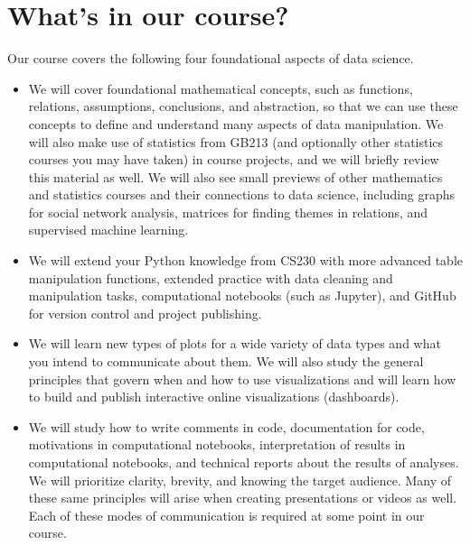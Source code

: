 \documentclass[letterpaper,10pt,english]{sphinxmanual}
\begin{document}
\section{What’s in our course?}
\label{\detokenize{chapter-1-intro-to-data-science:what-s-in-our-course}}
Our course covers the following four foundational aspects of data science.
\begin{itemize}
\item {} 
 We will cover foundational mathematical concepts, such as functions, relations, assumptions, conclusions, and abstraction, so that we can use these concepts to define and understand many aspects of data manipulation.  We will also make use of statistics from GB213 (and optionally other statistics courses you may have taken) in course projects, and we will briefly review this material as well.  We will also see small previews of other mathematics and statistics courses and their connections to data science, including graphs for social network analysis, matrices for finding themes in relations, and supervised machine learning.

\item {} 
 We will extend your Python knowledge from CS230 with more advanced table manipulation functions, extended practice with data cleaning and manipulation tasks, computational notebooks (such as Jupyter), and GitHub for version control and project publishing.

\item {} 
 We will learn new types of plots for a wide variety of data types and what you intend to communicate about them.  We will also study the general principles that govern when and how to use visualizations and will learn how to build and publish interactive online visualizations (dashboards).

\item {} 
 We will study how to write comments in code, documentation for code, motivations in computational notebooks, interpretation of results in computational notebooks, and technical reports about the results of analyses.  We will prioritize clarity, brevity, and knowing the target audience.  Many of these same principles will arise when creating presentations or videos as well.  Each of these modes of communication is required at some point in our course.

\end{itemize}
\end{document}
